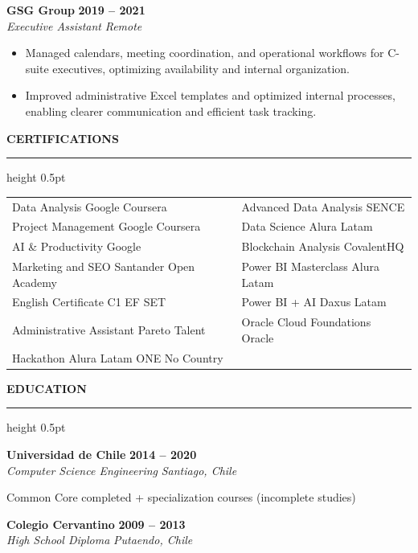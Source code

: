 \documentclass[12pt, a4paper]{article}
\newcommand{\seccion}[1]{%
  \vspace{7pt}%
  {\large\bfseries #1}%
  \vspace{1pt}%
  \hrule height 0.5pt%
  \vspace{2pt}%
}
\newcommand{\trabajo}[4]{%
  \noindent\textbf{#1} \hfill \textbf{#2}\\
  \textit{#3} \hfill \textit{#4}%
  \vspace{1pt}%
}
\newcommand{\edu}[4]{%
  \noindent\textbf{#1} \hfill \textbf{#2}\\
  \textit{#3} \hfill \textit{#4}%
  \vspace{1pt}%
}
\begin{document}
\trabajo{GSG Group}{2019 -- 2021}{Executive Assistant}{Remote}
\begin{itemize}
  \item Managed calendars, meeting coordination, and operational workflows for
        C-suite executives, optimizing availability and internal organization.
  \item Improved administrative Excel templates and optimized internal processes,
        enabling clearer communication and efficient task tracking.
\end{itemize}

\seccion{CERTIFICATIONS}

\begin{tabularx}{\textwidth}{@{} X X @{}}
  Data Analysis \textbar{} Google Coursera                  & Advanced Data Analysis \textbar{} SENCE               \\[2pt]
  Project Management \textbar{} Google Coursera             & Data Science \textbar{} Alura Latam                   \\[2pt]
  AI \& Productivity \textbar{} Google                      & Blockchain Analysis \textbar{} CovalentHQ             \\[2pt]
  Marketing and SEO \textbar{} Santander Open Academy       & Power BI Masterclass \textbar{} Alura Latam            \\[2pt]
  English Certificate C1 \textbar{} EF SET                  & Power BI + AI \textbar{} Daxus Latam                  \\[2pt]
  Administrative Assistant \textbar{} Pareto Talent         & Oracle Cloud Foundations \textbar{} Oracle            \\[2pt]
  Hackathon Alura Latam ONE \textbar{} No Country           &                                                       \\
\end{tabularx}

\seccion{EDUCATION}

\edu{Universidad de Chile}{2014 -- 2020}%
    {Computer Science Engineering}{Santiago, Chile}

\noindent\small Common Core completed + specialization courses (incomplete studies)
\vspace{4pt}

\edu{Colegio Cervantino}{2009 -- 2013}%
    {High School Diploma}{Putaendo, Chile}
\end{document}
